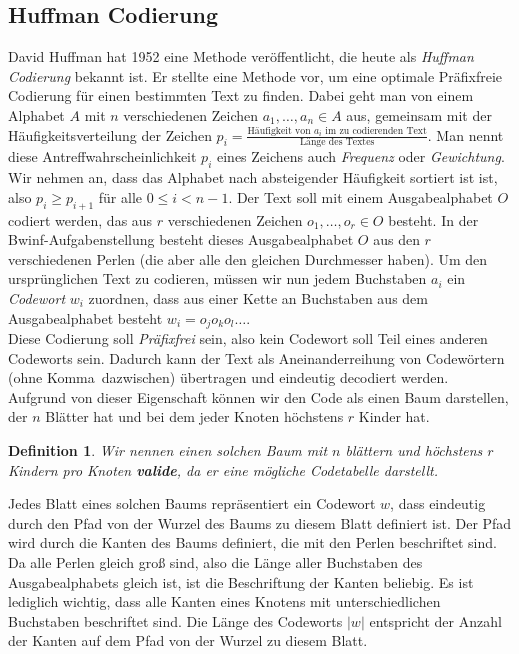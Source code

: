 \documentclass[a4paper,10pt,ngerman]{scrartcl}
\newtheorem{definition}[satz]{Definition}
\begin{document}
    \subsection{Huffman Codierung}
    David Huffman hat 1952 eine Methode veröffentlicht, die heute als \textit{Huffman Codierung} bekannt ist\autocite{noauthor_huffman-kodierung_2025}.
    Er stellte eine Methode vor, um eine optimale Präfixfreie Codierung für einen bestimmten Text zu finden.
    Dabei geht man von einem Alphabet $A$ mit $n$ verschiedenen Zeichen $a_1, \dots, a_n \in A$ aus, gemeinsam mit der Häufigkeitsverteilung der Zeichen $p_i = \frac {\text{Häufigkeit von $a_i$ im zu codierenden Text}} {\text{Länge des Textes}}$. Man nennt diese Antreffwahrscheinlichkeit $p_i$ eines Zeichens auch \textit{Frequenz} oder \textit{Gewichtung}.
    Wir nehmen an, dass das Alphabet nach absteigender Häufigkeit sortiert ist ist, also $p_i \ge p_{i + 1}$ für alle $0 \le i < n - 1$.
    Der Text soll mit einem Ausgabealphabet $O$ codiert werden, das aus $r$ verschiedenen Zeichen $o_1, \dots, o_r \in O$ besteht. In der Bwinf-Aufgabenstellung besteht dieses Ausgabealphabet $O$ aus den $r$ verschiedenen Perlen (die aber alle den gleichen Durchmesser haben). Um den ursprünglichen Text zu codieren, müssen wir nun jedem Buchstaben $a_i$ ein \textit{Codewort} $w_i$ zuordnen, dass aus einer Kette an Buchstaben aus dem Ausgabealphabet besteht $w_i = o_j o_k o_l \dots$. \\
    Diese Codierung soll \textit{Präfixfrei} sein, also kein Codewort soll Teil eines anderen Codeworts sein.
    Dadurch kann der Text als Aneinanderreihung von Codewörtern (ohne \glqq Komma\grqq~dazwischen) übertragen und eindeutig decodiert werden. \\
    Aufgrund von dieser Eigenschaft können wir den Code als einen Baum darstellen, der $n$ Blätter hat und bei dem jeder Knoten höchstens $r$ Kinder hat.
    \begin{definition}
        Wir nennen einen solchen Baum mit $n$ blättern und höchstens $r$ Kindern pro Knoten \textbf{valide}, da er eine mögliche Codetabelle darstellt.
    \end{definition}
    Jedes Blatt eines solchen Baums repräsentiert ein Codewort $w$, dass eindeutig durch den Pfad von der Wurzel des Baums zu diesem Blatt definiert ist. Der Pfad wird durch die Kanten des Baums definiert, die mit den Perlen beschriftet sind. Da alle Perlen gleich groß sind, also die Länge aller Buchstaben des Ausgabealphabets gleich ist, ist die Beschriftung der Kanten beliebig. Es ist lediglich wichtig, dass alle Kanten eines Knotens mit unterschiedlichen Buchstaben beschriftet sind. Die Länge des Codeworts $|w|$ entspricht der Anzahl der Kanten auf dem Pfad von der Wurzel zu diesem Blatt. \\
\end{document}
